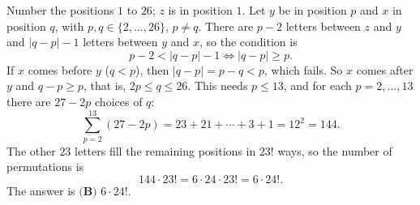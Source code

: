 Number the positions $1$ to $26$; $z$ is in position $1$. Let $y$ be in position $p$ and $x$ in position $q$, with $p,q\in\{2,\dots,26\}$, $p\ne q$. There are $p-2$ letters between $z$ and $y$ and $|q-p|-1$ letters between $y$ and $x$, so the condition is
\[p-2<|q-p|-1\iff|q-p|\ge p.\]
If $x$ comes before $y$ ($q<p$), then $|q-p|=p-q<p$, which fails. So $x$ comes after $y$ and $q-p\ge p$, that is, $2p\le q\le26$. This needs $p\le13$, and for each $p=2,\dots,13$ there are $27-2p$ choices of $q$:
\[\sum_{p=2}^{13}(27-2p)=23+21+\cdots+3+1=12^2=144.\]
The other $23$ letters fill the remaining positions in $23!$ ways, so the number of permutations is
\[144\cdot23!=6\cdot24\cdot23!=6\cdot24!.\]
The answer is $\boxed{\textbf{(B) }6\cdot24!}$.
